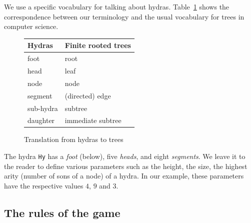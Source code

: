 We use a specific vocabulary for talking about hydras. Table~\ref{tab:hyd2tree} shows the correspondence between our terminology and the usual vocabulary for trees in computer science.


\begin{figure}[h]
  \centering
  \begin{tabular}{ll}
Hydras & Finite rooted trees\\
\hline
foot & root\\
head & leaf\\
node & node\\
segment  & (directed) edge \\
sub-hydra & subtree\\
daughter & immediate subtree\\
\end{tabular}
  \caption{Translation from hydras to trees}
  \label{tab:hyd2tree}
\end{figure}


The hydra \texttt{Hy} has a \emph{foot} (below), five \emph{heads}, and eight \emph{segments}. 
We leave it to the reader to define various parameters such as the height, the size, the highest arity (number of sons of a node) of a hydra. In our example, these parameters have the respective values $4$, $9$ and $3$.




\subsection{The rules of the game}

\label{sec:orgheadline44}
\label{sect:replication-def}

